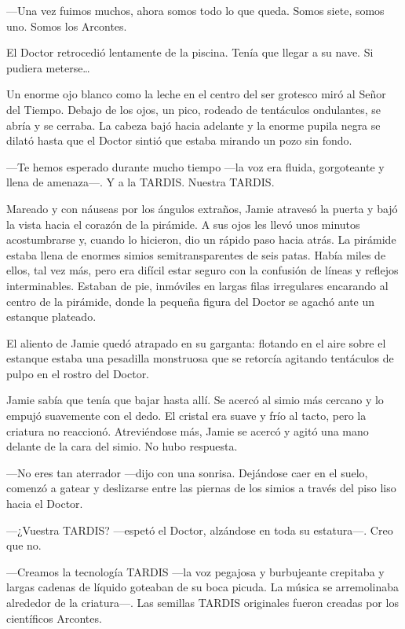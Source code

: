 ---Una vez fuimos muchos, ahora somos todo lo que queda. Somos siete,
somos uno. Somos los Arcontes.

El Doctor retrocedió lentamente de la piscina. Tenía que llegar a su
nave. Si pudiera meterse\ldots{}

Un enorme ojo blanco como la leche en el centro del ser grotesco miró al
Señor del Tiempo. Debajo de los ojos, un pico, rodeado de tentáculos
ondulantes, se abría y se cerraba. La cabeza bajó hacia adelante y la
enorme pupila negra se dilató hasta que el Doctor sintió que estaba
mirando un pozo sin fondo.

---Te hemos esperado durante mucho tiempo ---la voz era fluida,
gorgoteante y llena de amenaza---. Y a la TARDIS. Nuestra TARDIS.

Mareado y con náuseas por los ángulos extraños, Jamie atravesó la puerta
y bajó la vista hacia el corazón de la pirámide. A sus ojos les llevó
unos minutos acostumbrarse y, cuando lo hicieron, dio un rápido paso
hacia atrás. La pirámide estaba llena de enormes simios
semitransparentes de seis patas. Había miles de ellos, tal vez más, pero
era difícil estar seguro con la confusión de líneas y reflejos
interminables. Estaban de pie, inmóviles en largas filas irregulares
encarando al centro de la pirámide, donde la pequeña figura del Doctor
se agachó ante un estanque plateado.

El aliento de Jamie quedó atrapado en su garganta: flotando en el aire
sobre el estanque estaba una pesadilla monstruosa que se retorcía
agitando tentáculos de pulpo en el rostro del Doctor.

Jamie sabía que tenía que bajar hasta allí. Se acercó al simio más
cercano y lo empujó suavemente con el dedo. El cristal era suave y frío
al tacto, pero la criatura no reaccionó. Atreviéndose más, Jamie se
acercó y agitó una mano delante de la cara del simio. No hubo respuesta.

---No eres tan aterrador ---dijo con una sonrisa. Dejándose caer en el
suelo, comenzó a gatear y deslizarse entre las piernas de los simios a
través del piso liso hacia el Doctor.

---¿Vuestra TARDIS? ---espetó el Doctor, alzándose en toda su
estatura---. Creo que no.

---Creamos la tecnología TARDIS ---la voz pegajosa y burbujeante
crepitaba y largas cadenas de líquido goteaban de su boca picuda. La
música se arremolinaba alrededor de la criatura---. Las semillas TARDIS
originales fueron creadas por los científicos Arcontes.

